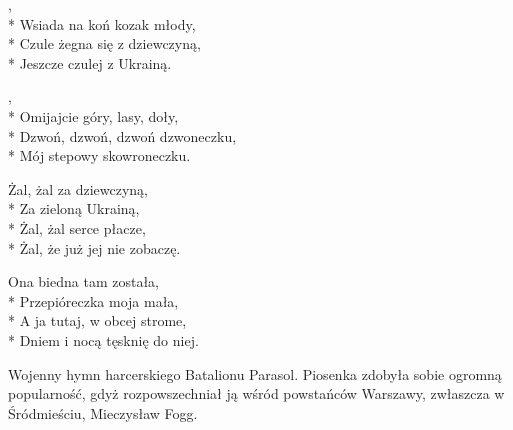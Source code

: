 \begin{lyrics}[longestline={Hej, tam gdzieś znad czarnej wody,}]

,\\*
Wsiada na koń kozak młody,\\*
Czule żegna się z dziewczyną,\\*
Jeszcze czulej z Ukrainą.

\begin{chorus}
,\\*
Omijajcie góry, lasy, doły,\\*
Dzwoń, dzwoń, dzwoń dzwoneczku,\\*
Mój stepowy skowroneczku.
\end{chorus}

Żal, żal za dziewczyną,\\*
Za zieloną Ukrainą,\\*
Żal, żal serce płacze,\\*
Żal, że już jej nie zobaczę.

\chorusref

Ona biedna tam została,\\*
Przepióreczka moja mała,\\*
A ja tutaj, w obcej strome,\\*
Dniem i nocą tęsknię do niej.

\chorusref
\end{lyrics}



\begin{info} Wojenny hymn harcerskiego Batalionu Parasol. Piosenka zdobyła sobie ogromną popularność, gdyż rozpowszechniał ją wśród powstańców Warszawy, zwłaszcza w Śródmieściu, Mieczysław Fogg.\end{info}

